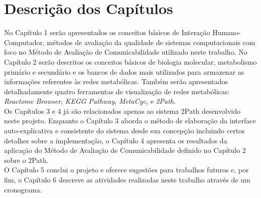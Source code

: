 \section*{Descrição dos Capítulos}
\indent No Capítulo 1 serão apresentados os conceitos básicos de Interação Humano-Computador, métodos de avaliação da qualidade de sistemas computacionais com foco no Método de Avaliação de Comunicabilidade utilizado neste trabalho.
\indent No Capítulo 2 serão descritos os conceitos básicos de biologia molecular, metabolismo primário e secundário e os bancos de dados mais utilizados para armazenar as informações referentes às redes metabólicas. Também serão apresentados detalhadamente quatro ferramentas de visualização de redes metabólicas: \textit{Reactome Browser}, \textit{KEGG Pathway}, \textit{MetaCyc}, e \textit{2Path}. \\ 
\indent Os Capítulos 3 e 4 já são relacionados apenas ao sistema 2Path desenvolvido neste projeto. Enquanto o Capítulo 3 aborda o método de elaboração da interface auto-explicativa e consistente do sistema desde sua concepção incluindo certos detalhes sobre a implementação, o Capítulo 4 apresenta os resultados da aplicação do Método de Avaliação de Comunicabilidade definido no Capítulo 2 sobre o 2Path. \\
\indent O Capítulo 5  conclui o projeto e oferece sugestões para trabalhos futuros e, por fim, o Capítulo 6 descreve as atividades realizadas neste trabalho através de um cronograma.